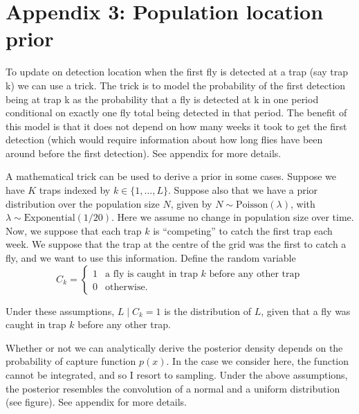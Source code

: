 \documentclass[
]{book}
\begin{document}
\hypertarget{appendix-3-population-location-prior}{%
\section{Appendix 3: Population location prior}\label{appendix-3-population-location-prior}}

To update on detection location when the first fly is detected at a trap (say trap k) we can use a trick. The trick is to model the probability of the first detection being at trap k as the probability that a fly is detected at k in one period conditional on exactly one fly total being detected in that period. The benefit of this model is that it does not depend on how many weeks it took to get the first detection (which would require information about how long flies have been around before the first detection). See appendix for more details.

A mathematical trick can be used to derive a prior in some cases. Suppose we have \(K\) traps indexed by \(k \in \{1, \ldots, L\}\). Suppose also that we have a prior distribution over the population size \(N\), given by \(N \sim \mathrm{Poisson} (\lambda)\), with \(\lambda \sim \mathrm{Exponential(1/20)}\). Here we assume no change in population size over time. Now, we suppose that each trap \(k\) is ``competing'' to catch the first trap each week. We suppose that the trap at the centre of the grid was the first to catch a fly, and we want to use this information. Define the random variable
\[
C_k = \begin{cases}1 & \text{a fly is caught in trap } k \text{ before any other trap} \\ 0 & \text{otherwise}. \end{cases}
\]

Under these assumptions, \(L \mid C_k = 1\) is the distribution of \(L\), given that a fly was caught in trap \(k\) before any other trap.

Whether or not we can analytically derive the posterior density depends on the probability of capture function \(p(x)\). In the case we consider here, the function cannot be integrated, and so I resort to sampling. Under the above assumptions, the posterior resembles the convolution of a normal and a uniform distribution (see figure). See appendix for more details.

  
\end{document}
